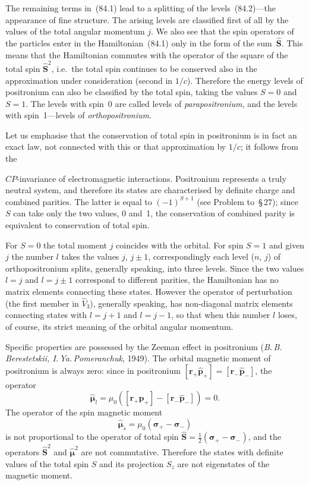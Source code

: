 The remaining terms in~(84.1) lead to a splitting of the levels~(84.2)---the appearance of fine structure. The arising levels are classified first of all by the values of the total angular momentum $j$. We also see that the spin operators of the particles enter in the Hamiltonian~(84.1) only in the form of the sum~$\hat{\mathbf{S}}$. This means that the Hamiltonian commutes with the operator of the square of the total spin $\hat{\mathbf{S}}^2$, i.e.\ the total spin continues to be conserved also in the approximation under consideration (second in $1/c$). Therefore the energy levels of positronium can also be classified by the total spin, taking the values $S = 0$ and $S = 1$. The levels with spin~0 are called levels of \textit{parapositronium}, and the levels with spin~1---levels of \textit{orthopositronium}.

Let us emphasise that the conservation of total spin in positronium is in fact an exact law, not connected with this or that approximation by $1/c$; it follows from the

$CP$-invariance of electromagnetic interactions. Positronium represents a truly neutral system, and therefore its states are characterised by definite charge and combined parities. The latter is equal to $(-1)^{S+1}$ (see Problem to~\S\,27); since $S$ can take only the two values, 0 and~1, the conservation of combined parity is equivalent to conservation of total spin.

For $S = 0$ the total moment $j$ coincides with the orbital. For spin $S = 1$ and given $j$ the number $l$ takes the values $j$, $j\pm 1$, correspondingly each level ($n$, $j$) of orthopositronium splits, generally speaking, into three levels. Since the two values $l = j$ and $l = j\pm 1$ correspond to different parities, the Hamiltonian has no matrix elements connecting these states. However the operator of perturbation (the first member in $\hat{V}_3$), generally speaking, has non-diagonal matrix elements connecting states with $l = j + 1$ and $l = j - 1$, so that when this number $l$ loses, of course, its strict meaning of the orbital angular momentum.

Specific properties are possessed by the Zeeman effect in positronium (\textit{B.\,B.\,Berestetskii, I.\,Ya.\,Pomeranchuk}, 1949). The orbital magnetic moment of positronium is always zero: since in positronium $[\mathbf{r}_+\hat{\mathbf{p}}_+] = [\mathbf{r}_-\hat{\mathbf{p}}_-]$, the operator
\[
\hat{\boldsymbol{\mu}}_l = \mu_0([\mathbf{r}_+\hat{\mathbf{p}}_+] - [\mathbf{r}_-\hat{\mathbf{p}}_-]) = 0.
\]
The operator of the spin magnetic moment
\begin{equation}
\hat{\boldsymbol{\mu}}_s = \mu_0(\boldsymbol{\sigma}_+ - \boldsymbol{\sigma}_-)
\tag{84.3}
\end{equation}
is not proportional to the operator of total spin $\hat{\mathbf{S}} = \frac{1}{2}(\boldsymbol{\sigma}_+ - \boldsymbol{\sigma}_-)$, and the operators $\hat{\mathbf{S}}^2$ and $\hat{\boldsymbol{\mu}}^2$ are not commutative. Therefore the states with definite values of the total spin $S$ and its projection $S_z$ are not eigenstates of the magnetic moment.

